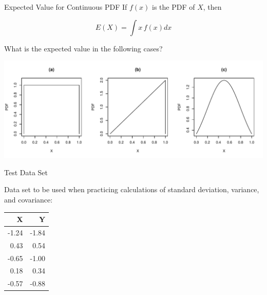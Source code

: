 \begin{frame}{Expected Value for Continuous PDF}
    If $f(x)$ is the PDF of $X$, then
    
    \begin{equation*}
    E(X) = \int x \, f(x) dx
    \end{equation*}
    
    \begin{example}
        \medskip
        What is the expected value in the following cases?
        
        \includegraphics[width=\textwidth]{R/plots/expected_value_pdf_ex}
    \end{example}
\end{frame}

\begin{frame}{Test Data Set}

    Data set to be used when practicing calculations of standard deviation, variance, and covariance:
    
    \begin{center}
        \begin{tabular}{r r}
            X       &   Y \\
            \hline
            -1.24   &   -1.84 \\
            0.43    &   0.54 \\
            -0.65   &   -1.00 \\
            0.18    &   0.34 \\
            -0.57   &   -0.88
        \end{tabular}
    \end{center}

\end{frame}

